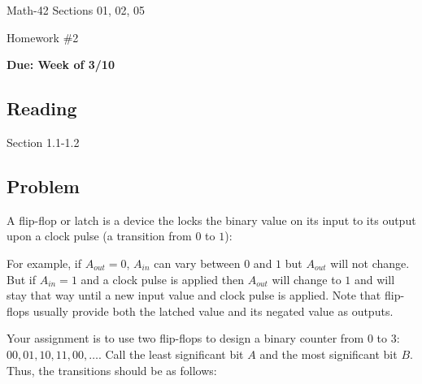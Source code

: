 \documentclass[letterpaper,12pt,fleqn]{article}
\begin{document}
\begin{center}
  \large
  Math-42 Sections 01, 02, 05

  \Large
  Homework \#2

  \large
  \textbf{Due: Week of 3/10}
\end{center}

\subsection*{Reading}

Section 1.1-1.2

\subsection*{Problem}

A flip-flop or latch is a device the locks the binary value on its input to its output upon a clock pulse (a
transition from \(0\) to \(1\)):

\bigskip

\begin{center}
\end{center}

\bigskip

For example, if \(A_{out}=0\), \(A_{in}\) can vary between \(0\) and \(1\) but \(A_{out}\) will not change.  But if
\(A_{in}=1\) and a clock pulse is applied then \(A_{out}\) will change to \(1\) and will stay that way until a new
input value and clock pulse is applied.  Note that flip-flops usually provide both the latched value and its
negated value as outputs.

Your assignment is to use two flip-flops to design a binary counter from \(0\) to \(3\): \(00, 01, 10, 11, 00,
\ldots\).  Call the least significant bit \(A\) and the most significant bit \(B\).  Thus, the transitions should be
as follows:
\end{document}
